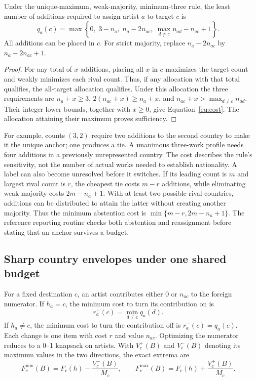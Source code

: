 \begin{proposition}
Under the unique-maximum, weak-majority, minimum-three rule, the least number of additions required to assign artist $a$ to target $c$ is
\begin{equation}
 q_a(c)=\max\left\{0,\;3-n_a,\;n_a-2n_{ac},\;
       \max_{d\ne c}n_{ad}-n_{ac}+1\right\}.
 \label{eq:cost}
\end{equation}
All additions can be placed in $c$. For strict majority, replace $n_a-2n_{ac}$ by $n_a-2n_{ac}+1$.
\end{proposition}
\begin{proof}
For any total of $x$ additions, placing all $x$ in $c$ maximizes the target count and weakly minimizes each rival count. Thus, if any allocation with that total qualifies, the all-target allocation qualifies. Under this allocation the three requirements are $n_a+x\geq3$, $2(n_{ac}+x)\geq n_a+x$, and $n_{ac}+x>\max_{d\ne c}n_{ad}$. Their integer lower bounds, together with $x\geq0$, give Equation~\ref{eq:cost}. The allocation attaining their maximum proves sufficiency.
\end{proof}

For example, counts $(3,2)$ require two additions to the second country to make it the unique anchor; one produces a tie. A unanimous three-work profile needs four additions in a previously unrepresented country. The cost describes the rule's sensitivity, not the number of actual works needed to establish nationality. A label can also become unresolved before it switches. If its leading count is $m$ and largest rival count is $r$, the cheapest tie costs $m-r$ additions, while eliminating weak majority costs $2m-n_a+1$. With at least two possible rival countries, additions can be distributed to attain the latter without creating another majority. Thus the minimum abstention cost is $\min\{m-r,2m-n_a+1\}$. The reference reporting routine checks both abstention and reassignment before stating that an anchor survives a budget.

\subsection{Sharp country envelopes under one shared budget}
For a fixed destination $c$, an artist contributes either $0$ or $n_{ac}$ to the foreign numerator. If $h_a=c$, the minimum cost to turn its contribution on is
\begin{equation}
 r_a^{+}(c)=\min_{d\ne c}q_a(d).
\end{equation}
If $h_a\ne c$, the minimum cost to turn the contribution off is $r_a^{-}(c)=q_a(c)$. Each change is one item with cost $r$ and value $n_{ac}$. Optimizing the numerator reduces to a 0--1 knapsack on artists. With $V_c^{+}(B)$ and $V_c^{-}(B)$ denoting its maximum values in the two directions, the exact extrema are
\begin{equation}
 F_c^{\min}(B)=F_c(h)-\frac{V_c^{-}(B)}{M_c},\qquad
 F_c^{\max}(B)=F_c(h)+\frac{V_c^{+}(B)}{M_c}.
 \label{eq:envelope}
\end{equation}

